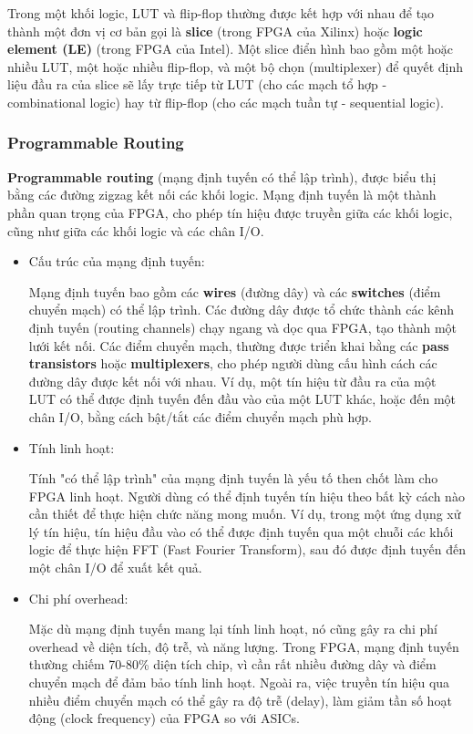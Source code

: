 \documentclass[a4paper]{article}
\begin{document}
\begin{itemize}
    Trong một khối logic, LUT và flip-flop thường được kết hợp với nhau để tạo thành một đơn vị cơ bản gọi là \textbf{slice} (trong FPGA của Xilinx) hoặc \textbf{logic element (LE)} (trong FPGA của Intel). Một slice điển hình bao gồm một hoặc nhiều LUT, một hoặc nhiều flip-flop, và một bộ chọn (multiplexer) để quyết định liệu đầu ra của slice sẽ lấy trực tiếp từ LUT (cho các mạch tổ hợp - combinational logic) hay từ flip-flop (cho các mạch tuần tự - sequential logic).
    

\end{itemize}
\subsubsection{Programmable Routing} 
\textbf{Programmable routing} (mạng định tuyến có thể lập trình), được biểu thị bằng các đường zigzag kết nối các khối logic. Mạng định tuyến là một thành phần quan trọng của FPGA, cho phép tín hiệu được truyền giữa các khối logic, cũng như giữa các khối logic và các chân I/O.
\begin{itemize}
    \item Cấu trúc của mạng định tuyến: \par
    Mạng định tuyến bao gồm các \textbf{wires} (đường dây) và các \textbf{switches} (điểm chuyển mạch) có thể lập trình. Các đường dây được tổ chức thành các kênh định tuyến (routing channels) chạy ngang và dọc qua FPGA, tạo thành một lưới kết nối. Các điểm chuyển mạch, thường được triển khai bằng các \textbf{pass transistors} hoặc \textbf{multiplexers}, cho phép người dùng cấu hình cách các đường dây được kết nối với nhau. Ví dụ, một tín hiệu từ đầu ra của một LUT có thể được định tuyến đến đầu vào của một LUT khác, hoặc đến một chân I/O, bằng cách bật/tắt các điểm chuyển mạch phù hợp.
    \item Tính linh hoạt: \par Tính "có thể lập trình" của mạng định tuyến là yếu tố then chốt làm cho FPGA linh hoạt. Người dùng có thể định tuyến tín hiệu theo bất kỳ cách nào cần thiết để thực hiện chức năng mong muốn. Ví dụ, trong một ứng dụng xử lý tín hiệu, tín hiệu đầu vào có thể được định tuyến qua một chuỗi các khối logic để thực hiện FFT (Fast Fourier Transform), sau đó được định tuyến đến một chân I/O để xuất kết quả.
    \item Chi phí overhead: \par
    Mặc dù mạng định tuyến mang lại tính linh hoạt, nó cũng gây ra chi phí overhead về diện tích, độ trễ, và năng lượng. Trong FPGA, mạng định tuyến thường chiếm 70-80\% diện tích chip, vì cần rất nhiều đường dây và điểm chuyển mạch để đảm bảo tính linh hoạt. Ngoài ra, việc truyền tín hiệu qua nhiều điểm chuyển mạch có thể gây ra độ trễ (delay), làm giảm tần số hoạt động (clock frequency) của FPGA so với ASICs.

\end{itemize}
\end{document}
